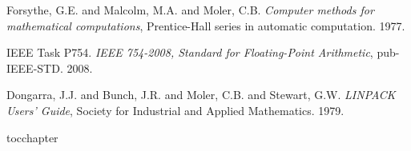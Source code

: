 \documentclass[11pt, spanish]{article}
\begin{document}
\begingroup
\renewcommand{\section}[2]{}%
\begin{thebibliography}{}

   Forsythe, G.E. and Malcolm, M.A. and Moler, C.B. {\em Computer methods for mathematical computations}, Prentice-Hall series in automatic computation. 1977.
  
   IEEE Task P754. {\em IEEE 754-2008, Standard for Floating-Point Arithmetic}, pub-IEEE-STD. 2008.
  
   Dongarra, J.J. and Bunch, J.R. and Moler, C.B. and Stewart, G.W. {\em LINPACK Users' Guide}, Society for Industrial and Applied Mathematics. 1979.
  
\end{thebibliography}
\endgroup

\newpage
\section{Scripts}







\addcontentsline{toc}{chapter}{\lstlistlistingname}
\lstlistoflistings


\end{document}
